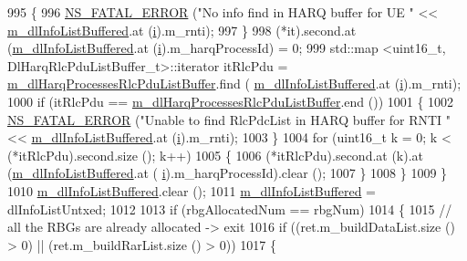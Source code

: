 \begin{DoxyCode}
995             \{
996               \hyperlink{group__fatal_ga5131d5e3f75d7d4cbfd706ac456fdc85}{NS\_FATAL\_ERROR} (\textcolor{stringliteral}{"No info find in HARQ buffer for UE "} << 
      \hyperlink{classns3_1_1TdBetFfMacScheduler_ad28a9447cadd7f80c4fe5d3801d8828b}{m\_dlInfoListBuffered}.at (\hyperlink{bernuolliDistribution_8m_a6f6ccfcf58b31cb6412107d9d5281426}{i}).m\_rnti);
997             \}
998           (*it).second.at (\hyperlink{classns3_1_1TdBetFfMacScheduler_ad28a9447cadd7f80c4fe5d3801d8828b}{m\_dlInfoListBuffered}.at (\hyperlink{bernuolliDistribution_8m_a6f6ccfcf58b31cb6412107d9d5281426}{i}).m\_harqProcessId) = 0;
999           std::map <uint16\_t, DlHarqRlcPduListBuffer\_t>::iterator itRlcPdu =  
      \hyperlink{classns3_1_1TdBetFfMacScheduler_a066bceddaca3ed4a25974ada3aba3028}{m\_dlHarqProcessesRlcPduListBuffer}.find (
      \hyperlink{classns3_1_1TdBetFfMacScheduler_ad28a9447cadd7f80c4fe5d3801d8828b}{m\_dlInfoListBuffered}.at (\hyperlink{bernuolliDistribution_8m_a6f6ccfcf58b31cb6412107d9d5281426}{i}).m\_rnti);
1000           \textcolor{keywordflow}{if} (itRlcPdu == \hyperlink{classns3_1_1TdBetFfMacScheduler_a066bceddaca3ed4a25974ada3aba3028}{m\_dlHarqProcessesRlcPduListBuffer}.end ())
1001             \{
1002               \hyperlink{group__fatal_ga5131d5e3f75d7d4cbfd706ac456fdc85}{NS\_FATAL\_ERROR} (\textcolor{stringliteral}{"Unable to find RlcPdcList in HARQ buffer for RNTI "} << 
      \hyperlink{classns3_1_1TdBetFfMacScheduler_ad28a9447cadd7f80c4fe5d3801d8828b}{m\_dlInfoListBuffered}.at (\hyperlink{bernuolliDistribution_8m_a6f6ccfcf58b31cb6412107d9d5281426}{i}).m\_rnti);
1003             \}
1004           \textcolor{keywordflow}{for} (uint16\_t k = 0; k < (*itRlcPdu).second.size (); k++)
1005             \{
1006               (*itRlcPdu).second.at (k).at (\hyperlink{classns3_1_1TdBetFfMacScheduler_ad28a9447cadd7f80c4fe5d3801d8828b}{m\_dlInfoListBuffered}.at (
      \hyperlink{bernuolliDistribution_8m_a6f6ccfcf58b31cb6412107d9d5281426}{i}).m\_harqProcessId).clear ();
1007             \}
1008         \}
1009     \}
1010   \hyperlink{classns3_1_1TdBetFfMacScheduler_ad28a9447cadd7f80c4fe5d3801d8828b}{m\_dlInfoListBuffered}.clear ();
1011   \hyperlink{classns3_1_1TdBetFfMacScheduler_ad28a9447cadd7f80c4fe5d3801d8828b}{m\_dlInfoListBuffered} = dlInfoListUntxed;
1012 
1013   \textcolor{keywordflow}{if} (rbgAllocatedNum == rbgNum)
1014     \{
1015       \textcolor{comment}{// all the RBGs are already allocated -> exit}
1016       \textcolor{keywordflow}{if} ((ret.m\_buildDataList.size () > 0) || (ret.m\_buildRarList.size () > 0))
1017         \{

\end{DoxyCode}
